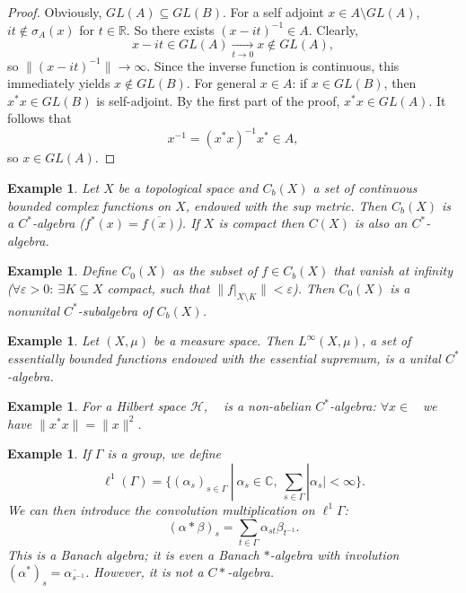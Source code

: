 \documentclass[10pt, a4paper]{article}
\newtheorem{example}[thm]{Example}
\newenvironment{noticeC}{%
  \tcolorbox[%
  notitle,
  empty,
  enhanced,  %
  breakable,
  coltext=black, 
  fontupper=\rmfamily,
  noparskip,
  sharp corners,
  boxrule=-1pt,  %
  frame hidden,
  left=7pt,  %
  right=7pt,
  top=5pt,
  bottom=5pt,
  before skip=2.5ex plus 2pt,
  after skip=2.5ex plus 2pt,
  overlay unbroken and last={%
  },
  ]}
{\endtcolorbox}
\newenvironment{myproof}%
  {\begin{noticeC}\begin{proof}}%
  {\end{proof}\end{noticeC}}
\newcommand{\R}{\mathbb {R}}
\newcommand{\C}{\mathbb {C}}
\DeclareMathOperator{\bh}{\mathcal{B} (\mathcal{H})}
\begin{document}
\begin{myproof}
  Obviously, $GL (A) \subseteq GL(B)$. For a self adjoint $x \in A \setminus GL(A)$,
  $it \notin \sigma_A (x)$ for $t \in \R$. So there exists $(x - it)^{-1} \in A$.
  Clearly, $$x - it \in GL(A) \xrightarrow[t \to 0]{} x \notin GL(A),$$
  so $\| (x - it)^{-1}\| \to \infty$. Since the inverse function is continuous,
  this immediately yields $x \notin GL (B)$.
  For general $x \in A$: if $x \in GL(B)$, then $x^* x \in GL(B)$ 
  is self-adjoint. By the first part of the proof, $x^* x \in GL(A)$.
  It follows that 
  \begin{equation*}
    x^{-1} = (x^* x)^{-1} x^* \in A,
  \end{equation*}
  so $x \in GL(A)$.
\end{myproof}

\begin{example}
  Let $X$ be a topological space and $C_b (X)$ a set of continuous bounded complex functions on $X$,
  endowed with the sup metric. Then $C_b (X)$ is a $C^*$-algebra ($f^*(x) = \overline{f(x)}$).
  If $X$ is compact then $C(X)$ is also an $C^*$-algebra.
\end{example}

\begin{example}
  Define $C_0 (X)$ as the subset of $f \in C_b (X)$
  that vanish at infinity ($\forall \varepsilon > 0:\ \exists K \subseteq X$ compact, such that $\|f\big|_{X \setminus K}\| < \varepsilon$).
  Then $C_0 (X)$ is a nonunital $C^*$-subalgebra of $C_b (X)$. 
\end{example}

\begin{example}
  Let $(X, \mu)$ be a measure space.
  Then $L^\infty (X, \mu)$, a set of essentially bounded functions endowed with the essential supremum, is a unital $C^*$-algebra.
\end{example}

\begin{example}
  For a Hilbert space $\mathcal{H}$, $\bh$ is a non-abelian $C^*$-algebra:
  $\forall x \in \bh$ we have $\| x^* x\| = \|x\|^2$.
\end{example}

\begin{example}
  If $\Gamma$ is a group, we define 
  $$\ell^1 (\Gamma) = \{(\alpha_s)_{s \in \Gamma}\ |\ \alpha_s \in \C,\ \sum_{s \in \Gamma} |\alpha_s| < \infty\}.$$
  We can then introduce the convolution multiplication on $\ell^1 \Gamma$:
  $$(\alpha * \beta)_s = \sum_{t \in \Gamma} \alpha_{st} \beta_{t^{-1}}.$$
  This is a Banach algebra; it is even a Banach $*$-algebra with involution 
  $(\alpha^*)_s = \overline{\alpha_{s^{-1}}}$. However, it is not a $ C*$-algebra.
\end{example}
\end{document}
